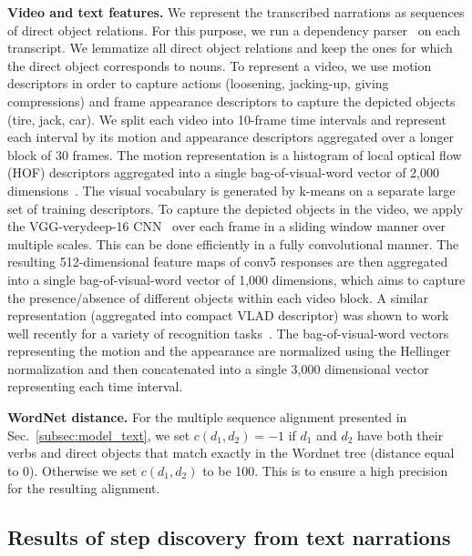 \documentclass[10pt,twocolumn,letterpaper]{article}
\begin{document}
%
%
%
%
%
%
%
%
%
%
%
%
%
%
%


\textbf{Video and text features.} 
We represent the transcribed narrations as sequences of direct object relations. 
For this purpose, we run a dependency parser~\cite{Marneffe06generating} on each transcript. 
We lemmatize all direct object relations and keep the ones for which the direct object corresponds to nouns.
%
%
%
To represent a video, we use motion descriptors in order to capture actions (loosening, jacking-up, giving compressions) and frame appearance descriptors to capture the depicted objects (tire, jack, car). 
We split each video into 10-frame time intervals and represent each interval by its motion and appearance descriptors aggregated over a longer block of 30 frames. The motion representation is a histogram of local optical flow (HOF) descriptors aggregated into a single bag-of-visual-word vector of 2,000 dimensions~\cite{Wang13action}.  The visual vocabulary is generated by k-means on a separate large set of training descriptors.
To capture the depicted objects in the video, we apply the VGG-verydeep-16 CNN~\cite{Simonyan14c} over each frame in a sliding window manner over multiple scales. This can be done efficiently in a fully convolutional manner. The resulting 512-dimensional feature maps of conv5 responses are then aggregated into a single bag-of-visual-word vector of 1,000 dimensions, which aims to capture the presence/absence of different objects within each video block. A similar representation (aggregated into compact VLAD descriptor) was shown to work well recently for a variety of recognition tasks~\cite{Cimpoi15}. The bag-of-visual-word vectors representing the motion and the appearance are normalized using the Hellinger normalization and then concatenated into a single 3,000 dimensional vector representing each time interval.

%
%
%
%
\textbf{WordNet distance.}
For the multiple sequence alignment presented in Sec.~\ref{subsec:model_text}, we set $c(d_1,d_2)=-1$ if $d_1$ and $d_2$ have both their verbs and direct objects that match exactly in the Wordnet tree (distance equal to 0).
Otherwise we set $c(d_1,d_2)$ to be 100.
This is to ensure a high precision for the resulting alignment. %


%
\subsection{Results of step discovery from text narrations}
\label{sec:step_discovery}
%
\label{subsec:exp0}
\end{document}
